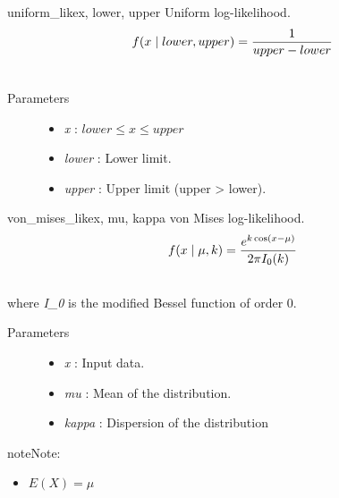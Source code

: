 \hypertarget{pymc.distributions.uniform_like}{}\begin{funcdesc}{uniform\_like}{x, lower, upper}
Uniform log-likelihood.
\begin{gather}
\begin{split}f(x \mid lower, upper) = \frac{1}{upper-lower}\end{split}\notag\\\begin{split}\end{split}\notag
\end{gather}\begin{description}
\item[Parameters] \leavevmode\begin{itemize}
\item {} 
\emph{x} : $lower \leq x \leq upper$

\item {} 
\emph{lower} : Lower limit.

\item {} 
\emph{upper} : Upper limit (upper \textgreater{} lower).

\end{itemize}

\end{description}
\end{funcdesc}

\hypertarget{pymc.distributions.von_mises_like}{}\begin{funcdesc}{von\_mises\_like}{x, mu, kappa}
von Mises log-likelihood.
\begin{gather}
\begin{split}f(x \mid \mu, k) = \frac{e^{k \cos(x - \mu)}}{2 \pi I_0(k)}\end{split}\notag\\\begin{split}\end{split}\notag
\end{gather}
where \emph{I\_0} is the modified Bessel function of order 0.
\begin{description}
\item[Parameters] \leavevmode\begin{itemize}
\item {} 
\emph{x} : Input data.

\item {} 
\emph{mu} : Mean of the distribution.

\item {} 
\emph{kappa} : Dispersion of the distribution

\end{itemize}

\end{description}

\begin{notice}{note}{Note:}\begin{itemize}
\item {} 
$E(X) = \mu$

\end{itemize}
\end{notice}
\end{funcdesc}

